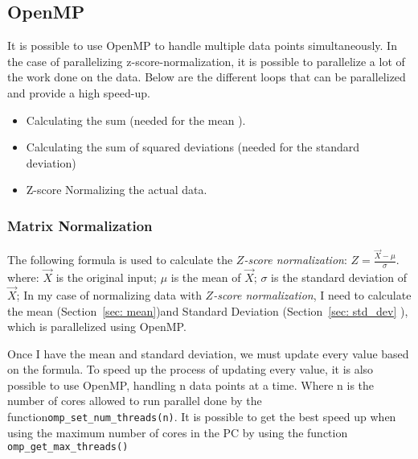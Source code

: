 \documentclass{article}
\newcommand{\zonenorm}{\textit{$Z$-score normalization}}
\begin{document}
\subsection{OpenMP} \label{sec: OpenMP}
It is possible to use OpenMP to handle multiple data points simultaneously. 
In the case of parallelizing z-score-normalization, it is possible to parallelize a lot of the work done on the data.
Below are the different loops that can be parallelized and provide a high speed-up. 
\begin{itemize}
    \item Calculating the sum (needed for the mean ). 
    \item Calculating the sum of squared deviations (needed for the standard deviation)
    \item Z-score Normalizing the actual data. 
\end{itemize}



\subsubsection{Matrix Normalization}\label{sec: norm}
The following formula is used to calculate the \zonenorm{}:
$Z = \frac{\vec{X} - \mu}{\sigma}$.
where:
$\vec{X}$ is the original input;
$\mu$ is the mean of $\vec{X}$;
$\sigma$ is the standard deviation of $\vec{X}$;
In my case of normalizing data with \zonenorm{}, I need to calculate the mean (Section~\ref{sec: mean})and Standard Deviation (Section~\ref{sec: std_dev} ), which is parallelized using OpenMP. 

Once I have the mean and standard deviation, we must update every value based on the formula. 
To speed up the process of updating every value, it is also possible to use OpenMP, handling n data points at a time. Where n is the number of cores allowed to run parallel done by the function\verb|omp_set_num_threads(n)|. It is possible to get the best speed up when using the maximum number of cores in the PC by using the function \verb|omp_get_max_threads()| 
\end{document}
